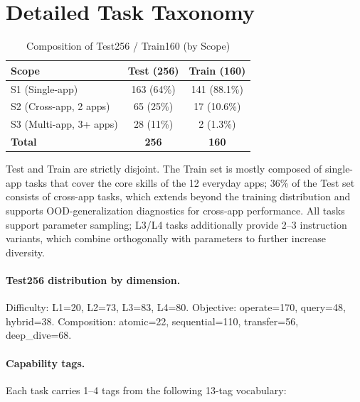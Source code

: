 \documentclass{llmxive}
\begin{document}
\section{Detailed Task Taxonomy}\label{app:taxonomy}

\begin{table}[!htbp]
  \centering\small
  \setlength{\tabcolsep}{3pt}
  \begin{tabular}{lcc}
    \toprule
    \textbf{Scope} & \textbf{Test (256)} & \textbf{Train (160)} \\
    \midrule
    S1 (Single-app)      & 163 (64\%)   & 141 (88.1\%) \\
    S2 (Cross-app, 2 apps)  & 65 (25\%)    & 17 (10.6\%)  \\
    S3 (Multi-app, 3+ apps) & 28 (11\%)    & 2 (1.3\%)      \\
    \midrule
    \textbf{Total}     & \textbf{256} & \textbf{160} \\
    \bottomrule
  \end{tabular}
  \caption{Composition of Test256 / Train160 (by Scope)}
  \label{tab:task-composition}
\end{table}

Test and Train are strictly disjoint. The Train set is mostly composed of single-app tasks that cover the core skills of the 12 everyday apps; 36\% of the Test set consists of cross-app tasks, which extends beyond the training distribution and supports OOD-generalization diagnostics for cross-app performance. All tasks support parameter sampling; L3/L4 tasks additionally provide 2--3 instruction variants, which combine orthogonally with parameters to further increase diversity.

\paragraph{Test256 distribution by dimension.} Difficulty: L1=20, L2=73, L3=83, L4=80. Objective: operate=170, query=48, hybrid=38. Composition: atomic=22, sequential=110, transfer=56, deep\_dive=68.

\paragraph{Capability tags.} Each task carries 1--4 tags from the following 13-tag vocabulary:
\end{document}
